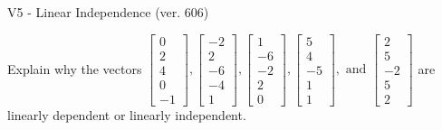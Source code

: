 \begin{exercise}
  \begin{exerciseTitle}V5 - Linear Independence (ver. 606)\end{exerciseTitle}
  \begin{exerciseStatement}
    Explain why the vectors \(\left[\begin{array}{r}
0 \\
2 \\
4 \\
0 \\
-1
\end{array}\right] , \left[\begin{array}{r}
-2 \\
2 \\
-6 \\
-4 \\
1
\end{array}\right] , \left[\begin{array}{r}
1 \\
-6 \\
-2 \\
2 \\
0
\end{array}\right] , \left[\begin{array}{r}
5 \\
4 \\
-5 \\
1 \\
1
\end{array}\right] , \text{ and } \left[\begin{array}{r}
2 \\
5 \\
-2 \\
5 \\
2
\end{array}\right]\) are linearly dependent or linearly independent.	



\end{exerciseStatement}
\end{exercise}
